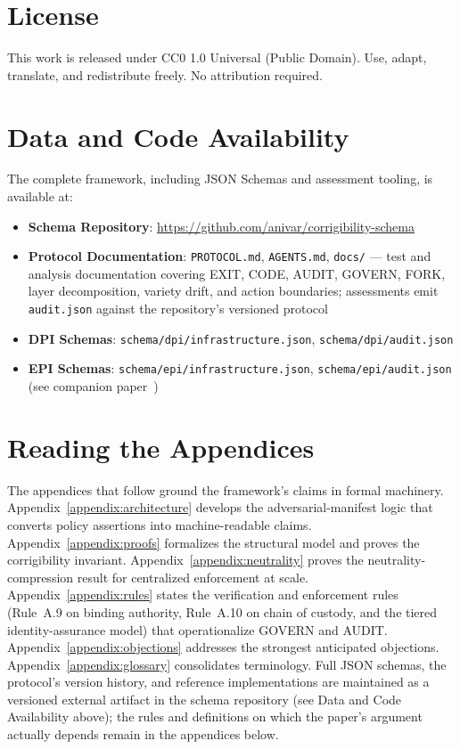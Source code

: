 \documentclass{article}
\begin{document}
\section*{License}

This work is released under CC0 1.0 Universal (Public Domain). Use, adapt, translate, and redistribute freely. No attribution required.

\section*{Data and Code Availability}

The complete framework, including JSON Schemas and assessment tooling, is available at:

\begin{itemize}
    \item \textbf{Schema Repository}: \url{https://github.com/anivar/corrigibility-schema}
    \item \textbf{Protocol Documentation}: \texttt{PROTOCOL.md}, \texttt{AGENTS.md}, \texttt{docs/} --- test and analysis documentation covering EXIT, CODE, AUDIT, GOVERN, FORK, layer decomposition, variety drift, and action boundaries; assessments emit \texttt{audit.json} against the repository's versioned protocol
    \item \textbf{DPI Schemas}: \texttt{schema/dpi/infrastructure.json}, \texttt{schema/dpi/audit.json}
    \item \textbf{EPI Schemas}: \texttt{schema/epi/infrastructure.json}, \texttt{schema/epi/audit.json} (see companion paper~\citep{aravind2026epi})
\end{itemize}

\section*{Reading the Appendices}

The appendices that follow ground the framework's claims in formal machinery. Appendix~\ref{appendix:architecture} develops the adversarial-manifest logic that converts policy assertions into machine-readable claims. Appendix~\ref{appendix:proofs} formalizes the structural model and proves the corrigibility invariant. Appendix~\ref{appendix:neutrality} proves the neutrality-compression result for centralized enforcement at scale. Appendix~\ref{appendix:rules} states the verification and enforcement rules (Rule~A.9 on binding authority, Rule~A.10 on chain of custody, and the tiered identity-assurance model) that operationalize GOVERN and AUDIT. Appendix~\ref{appendix:objections} addresses the strongest anticipated objections. Appendix~\ref{appendix:glossary} consolidates terminology. Full JSON schemas, the protocol's version history, and reference implementations are maintained as a versioned external artifact in the schema repository (see Data and Code Availability above); the rules and definitions on which the paper's argument actually depends remain in the appendices below.
\end{document}
